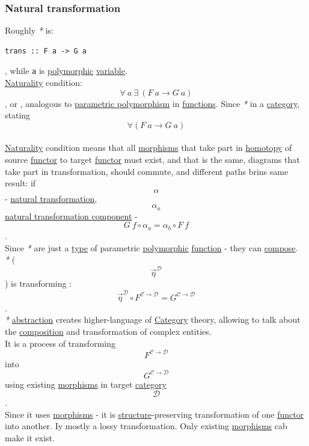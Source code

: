 \documentclass[11pt]{article}
\begin{document}
\subsubsection{\label{orgc8e9bc9}Natural transformation}
\label{sec:org9fe56ac}
Roughly \emph{*} is:\\
\begin{verbatim}
trans :: F a -> G a
\end{verbatim}
, while \texttt{a} is \hyperref[orgac4d581]{polymorphic} \hyperref[org0b57594]{variable}.\\

\hyperref[orgf952d87]{Naturality} condition: $$ \forall \ a \ \exists \ (F \ a \to G \ a) $$, or , analogous to \hyperref[org3c0b242]{parametric polymorphism} in \hyperref[orgaa8fb87]{functions}. Since \emph{*} in a \hyperref[org0450535]{category}, stating $$ \forall (F \ a \to G \ a) $$\\
\hyperref[orgf952d87]{Naturality} condition means that all \hyperref[org6c2fa5c]{morphisms} that take part in \hyperref[orgb19d3ed]{homotopy} of source \hyperref[orgf2f6841]{functor} to target \hyperref[orgf2f6841]{functor} must exist, and that is the same, diagrams that take part in transformation, should commute, and different paths brins same result: if $$ \alpha $$ - \hyperref[orgc8e9bc9]{natural transformation}, $$ \alpha_{a} $$ \hyperref[org716c3c1]{natural transformation component} - $$ G \ f \circ \alpha_{a} = \alpha_{b} \circ F \ f $$.\\
Since \emph{*} are just a \hyperref[orgc4aea2f]{type} of parametric \hyperref[orgac4d581]{polymorphic} \hyperref[orge15bc14]{function} - they can \hyperref[org5956f19]{compose}.\\

\emph{*} ($$ \overrightarrow{\eta}^{\mathcal{D}} $$) is transforming : $$ \overrightarrow{\eta}^{\mathcal{D}} \circ F^{\mathcal{C \to D}} = G^{\mathcal{C \to D}} $$.\\
\emph{*} \hyperref[org3470ee4]{abstraction} creates higher-language of \hyperref[org0450535]{Category} theory, allowing to talk about the \hyperref[orga128e7f]{composition} and transformation of complex entities.\\

It is a process of transforming $$ F^{\mathcal{C \to D}} $$ into $$ G^{\mathcal{C \to D}} $$ using existing \hyperref[org6c2fa5c]{morphisms} in target \hyperref[org0450535]{category} $$ \mathcal{D} $$.\\

Since it uses \hyperref[org6c2fa5c]{morphisms} - it is \hyperref[org8051f61]{structure}-preserving transformation of one \hyperref[orgf2f6841]{functor} into another. Iy mostly a lossy transformation. Only existing \hyperref[org6c2fa5c]{morphisms} cab make it exist.\\
\end{document}
